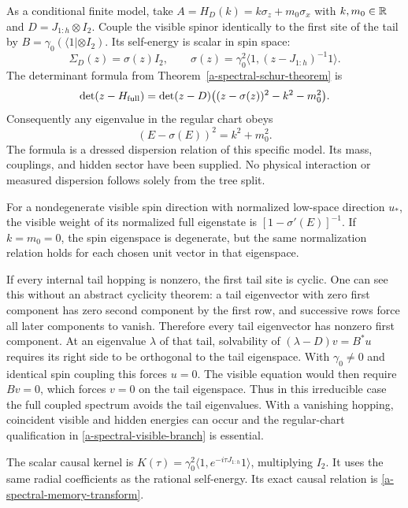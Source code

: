 As a conditional finite model, take
$A=H_D(k)=k\sigma_z+m_0\sigma_x$ with $k,m_0\in\mathbb R$ and
$D=J_{1:h}\otimes I_2$. Couple the visible spinor identically to the
first site of the tail by $B=\gamma_0(\langle1|\otimes I_2)$.
Its self-energy is scalar in spin space:
\[
 \Sigma_D(z)=\sigma(z)I_2,\qquad
 \sigma(z)=\gamma_0^2\langle1,(z-J_{1:h})^{-1}1\rangle.
\]
The determinant formula from Theorem~\ref{a-spectral-schur-theorem} is
\begin{equation}
 \det(z-H_{\rm full})
 =\det(z-D)\bigl((z-\sigma(z))^2-k^2-m_0^2\bigr).
 \label{a-spectral-visible-determinant}
\end{equation}
Consequently any eigenvalue in the regular chart obeys
\begin{equation}
 (E-\sigma(E))^2=k^2+m_0^2.
 \label{a-spectral-visible-branch}
\end{equation}
The formula is a dressed dispersion relation of this specific model.
Its mass, couplings, and hidden sector have been supplied. No physical
interaction or measured dispersion follows solely from the tree split.

For a nondegenerate visible spin direction with normalized low-space
direction $u_*$, the visible weight of its normalized full eigenstate is
$[1-\sigma'(E)]^{-1}$. If $k=m_0=0$, the spin eigenspace is degenerate,
but the same normalization relation holds for each chosen unit vector
in that eigenspace.

If every internal tail hopping is nonzero, the first tail site is cyclic.
One can see this without an abstract cyclicity theorem: a tail eigenvector
with zero first component has zero second component by the first row,
and successive rows force all later components to vanish. Therefore
every tail eigenvector has nonzero first component. At an eigenvalue
$\lambda$ of that tail, solvability of
$(\lambda-D)v=B^*u$ requires its right side to be orthogonal to the tail
eigenspace. With $\gamma_0\ne0$ and identical spin coupling this forces
$u=0$. The visible equation would then require $Bv=0$, which forces
$v=0$ on the tail eigenspace. Thus in this irreducible case the full
coupled spectrum avoids the tail eigenvalues. With a vanishing hopping,
coincident visible and hidden energies can occur and the regular-chart
qualification in \eqref{a-spectral-visible-branch} is essential.

The scalar causal kernel is
$K(\tau)=\gamma_0^2\langle1,e^{-i\tau J_{1:h}}1\rangle$, multiplying
$I_2$. It uses the same radial coefficients as the rational self-energy.
Its exact causal relation is \eqref{a-spectral-memory-transform}.


